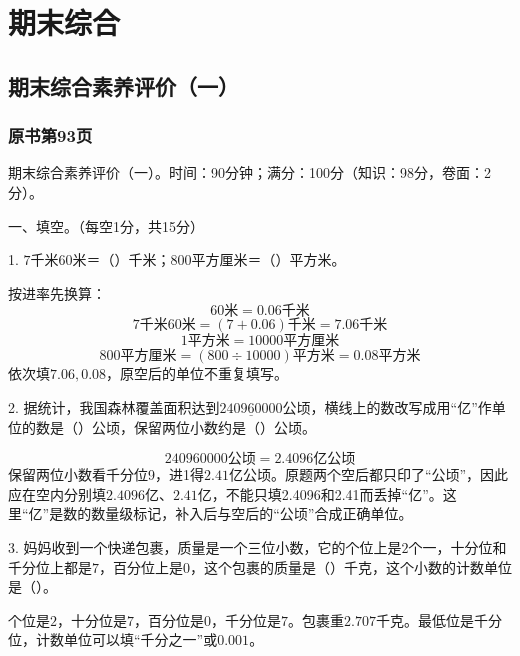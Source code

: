\chapter{期末综合}


\section{期末综合素养评价（一）}



\subsection*{原书第93页}

期末综合素养评价（一）。时间：90分钟；满分：100分（知识：98分，卷面：2分）。\par 一、填空。（每空1分，共15分）\par 1. \(7\)千米\(60\)米＝（\hspace{1.8em}）千米；\allowbreak{}\(800\)平方厘米＝（\hspace{1.8em}）平方米。\par
\begin{BookAnswer}
按进率先换算：\[60\text{米}=0.06\text{千米}\]\[7\text{千米}60\text{米}=(7+0.06)\text{千米}=7.06\text{千米}\]\[1\text{平方米}=10000\text{平方厘米}\]\[800\text{平方厘米}=(800\div10000)\text{平方米}=0.08\text{平方米}\]依次填\(7.06,0.08\)，原空后的单位不重复填写。
\end{BookAnswer}

2. 据统计，我国森林覆盖面积达到\(\underline{240960000}\)公顷，横线上的数改写成用“亿”作单位的数是（\hspace{1.8em}）公顷，保留两位小数约是（\hspace{1.8em}）公顷。\par
\begin{BookAnswer}
\[240960000\text{公顷}=2.4096\text{亿公顷}\]保留两位小数看千分位9，进1得\(2.41\text{亿公顷}\)。原题两个空后都只印了“公顷”，因此应在空内分别填\(2.4096\text{亿}\)、\(2.41\text{亿}\)，不能只填2.4096和2.41而丢掉“亿”。这里“亿”是数的数量级标记，补入后与空后的“公顷”合成正确单位。
\end{BookAnswer}

3. 妈妈收到一个快递包裹，质量是一个三位小数，它的个位上是\(2\)个一，十分位和千分位上都是\(7\)，百分位上是\(0\)，这个包裹的质量是（\hspace{1.8em}）千克，这个小数的计数单位是（\hspace{1.8em}）。\par
\begin{BookAnswer}
个位是\(2\)，十分位是\(7\)，百分位是\(0\)，千分位是\(7\)。包裹重\(2.707\)千克。最低位是千分位，计数单位可以填“千分之一”或\(0.001\)。
\end{BookAnswer}

